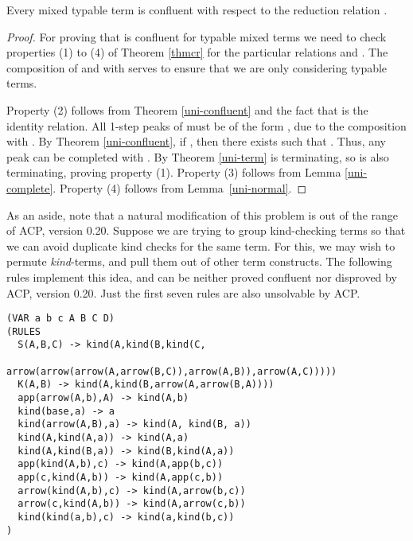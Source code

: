 \documentclass{LMCS}
\begin{document}
\begin{thm}
  \label{uni-combined-confluent}
  Every mixed typable term is confluent with respect to the reduction
  relation .

  \begin{proof}
For proving that  is confluent for typable mixed terms we 
need to check properties (1) to (4) of Theorem \ref{thmcr} for the 
particular relations 
and . The composition
of  and  with  serves
to ensure that we are only considering typable terms.

Property (2) follows from Theorem \ref{uni-confluent} and the fact that
 is the identity relation. All 1-step
peaks of must be of the form , due to the
composition with . By Theorem
\ref{uni-confluent}, if , then there exists
 such that . Thus, any
 peak  can be completed with . By Theorem \ref{uni-term}  is terminating,
so  is also
terminating, proving property (1). Property (3) follows from Lemma
\ref{uni-complete}. Property (4) follows from Lemma~\ref{uni-normal}.
  \end{proof}
  
\end{thm}











As an aside, note that a natural
modification of this problem is out of the range of ACP, version 0.20.
Suppose we are trying to group kind-checking terms so that we can
avoid duplicate kind checks for the same term.  For this, we may wish
to permute \textit{kind}-terms, and pull them out of other term
constructs.  The following rules implement this idea, and can be
neither proved confluent nor disproved by ACP, version 0.20.  Just the
first seven rules are also unsolvable by ACP. {\small
\begin{verbatim}
(VAR a b c A B C D)
(RULES
  S(A,B,C) -> kind(A,kind(B,kind(C,
              arrow(arrow(arrow(A,arrow(B,C)),arrow(A,B)),arrow(A,C)))))
  K(A,B) -> kind(A,kind(B,arrow(A,arrow(B,A))))
  app(arrow(A,b),A) -> kind(A,b)
  kind(base,a) -> a
  kind(arrow(A,B),a) -> kind(A, kind(B, a))
  kind(A,kind(A,a)) -> kind(A,a)
  kind(A,kind(B,a)) -> kind(B,kind(A,a))
  app(kind(A,b),c) -> kind(A,app(b,c))
  app(c,kind(A,b)) -> kind(A,app(c,b))
  arrow(kind(A,b),c) -> kind(A,arrow(b,c))
  arrow(c,kind(A,b)) -> kind(A,arrow(c,b))
  kind(kind(a,b),c) -> kind(a,kind(b,c))
)
\end{verbatim}
}
\end{document}
